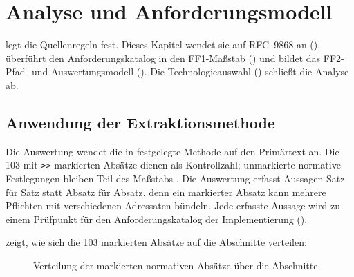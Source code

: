 
\chapter{Analyse und Anforderungsmodell}
\label{chap:analyse}

 legt die Quellenregeln fest. Dieses Kapitel wendet sie auf RFC~9868 an
(), überführt den Anforderungskatalog in den FF1-Maßstab
() und bildet das FF2-Pfad- und Auswertungsmodell
().
Die Technologieauswahl () schließt die Analyse ab.

\section{Anwendung der Extraktionsmethode}
\label{sec:extraktionsmethode}

Die Auswertung wendet die in  festgelegte Methode auf den Primärtext an. Die
103 mit \texttt{>{}>} markierten Absätze \cite[Sec.~2]{rfc9868} dienen als Kontrollzahl; unmarkierte
normative Festlegungen bleiben Teil des Maßstabs \cite{rfc2119,rfc8174}. Die Auswertung erfasst Aussagen
Satz für Satz statt Absatz für Absatz, denn ein markierter Absatz kann mehrere Pflichten mit verschiedenen
Adressaten bündeln. Jede erfasste Aussage wird zu einem Prüfpunkt für den Anforderungskatalog der
Implementierung ().

 zeigt, wie sich die 103 markierten Absätze auf die Abschnitte verteilen:

\begin{figure}[H]
  \centering
  \caption{Verteilung der markierten normativen Absätze über die Abschnitte}
  \label{fig:normverteilung}
\end{figure}

